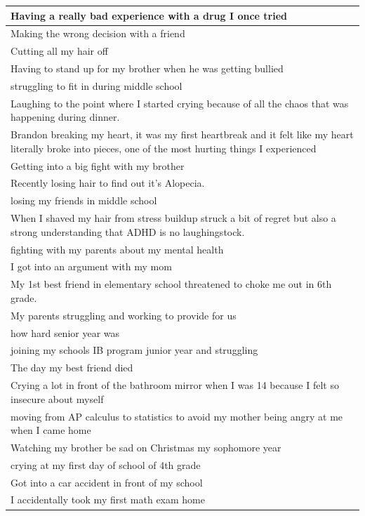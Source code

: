 \documentclass[
  .7em,
  letterpaper,
  DIV=11,
  numbers=noendperiod]{scrartcl}
\begin{document}
\begin{table}
\begin{tabular}{l}
\hline
Having a really bad experience with a drug I once tried\\
\hline
Making the wrong decision with a friend\\
\hline
Cutting all my hair off\\
\hline
Having to stand up for my brother when he was getting bullied\\
\hline
struggling to fit in during middle school\\
\hline
Laughing to the point where I started crying because of all the chaos that was happening during dinner.\\
\hline
Brandon breaking my heart, it was my first heartbreak and it felt like my heart literally broke into pieces, one of the most hurting things I experienced\\
\hline
Getting into a big fight with my brother\\
\hline
Recently losing hair to find out it's Alopecia.\\
\hline
losing my friends in middle school\\
\hline
When I shaved my hair from stress buildup struck a bit of regret but also a strong understanding that ADHD is no laughingstock.\\
\hline
fighting with my parents about my mental health\\
\hline
I got into an argument with my mom\\
\hline
My 1st best friend in elementary school threatened to choke me out in 6th grade.\\
\hline
My parents struggling and working to provide for us\\
\hline
how hard senior year was\\
\hline
joining my schools IB program junior year and struggling\\
\hline
The day my best friend died\\
\hline
Crying a lot in front of the bathroom mirror when I was 14 because I felt so insecure about myself\\
\hline
moving from AP calculus to statistics to avoid my mother being angry at me when I came home\\
\hline
Watching my brother be sad on Christmas my sophomore year\\
\hline
crying at my first day of school of 4th grade\\
\hline
Got into a car accident in front of my school\\
\hline
I accidentally took my first math exam home\\

\end{tabular}
\end{table}
\end{document}
